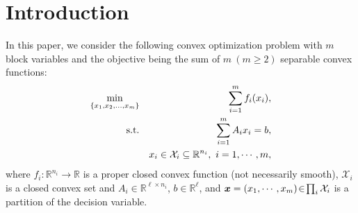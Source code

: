 \documentclass{mcom-l}
\theoremstyle{definition}
\theoremstyle{remark}
\numberwithin{equation}{section}
\begin{document}
\maketitle



\setcounter{equation}{0}
\section{Introduction}\label{secIntroduction}
In this paper, we consider the following convex optimization problem with $m$ block variables and the objective being the sum of $m\ (m\geq 2)$ separable convex functions:
\begin{eqnarray}\label{MultipleBlockProblem}
\min_{\{x_1,x_2,...,x_m\}}&& \sum_{i=1}^m f_i (x_i),\nonumber\\
\hbox{s.t.}&& \sum_{i=1}^m A_i x_i = b,\\
&& x_i \in {\mathcal{X}}_i\subseteq \mathbb{R}^{n_i},\ i = 1,\cdots,m,\nonumber
\end{eqnarray}
where $f_i:\mathbb{R}^{n_i}\rightarrow \mathbb{R}$ is a proper closed convex function (not necessarily smooth), ${\mathcal{X}}_i$ is a closed convex set and $A_i\in \mathbb{R}^{\ell\times n_i}$, $b\in \mathbb{R}^{\ell}$, and $\mbox{\boldmath$x$}=(x_1,\cdots, x_m)\!\in\!\prod_i \mathcal{X}_i$ is a partition of the decision variable.
\end{document}
